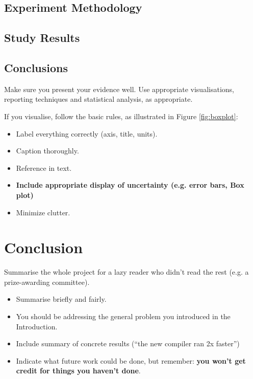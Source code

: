 \documentclass{l4proj}
\begin{document}
\section{Experiment Methodology}
\section{Study Results}

\section{Conclusions}
Make sure you present your evidence well. Use appropriate visualisations, reporting techniques and statistical analysis, as appropriate.

If you visualise, follow the basic rules, as illustrated in Figure \ref{fig:boxplot}:
\begin{itemize}
\item Label everything correctly (axis, title, units).
\item Caption thoroughly.
\item Reference in text.
\item \textbf{Include appropriate display of uncertainty (e.g. error bars, Box plot)}
\item Minimize clutter.
\end{itemize}

\chapter{Conclusion}    
Summarise the whole project for a lazy reader who didn't read the rest (e.g. a prize-awarding committee).

\begin{itemize}
    \item
        Summarise briefly and fairly.
    \item
        You should be addressing the general problem you introduced in the
        Introduction.        
    \item
        Include summary of concrete results (``the new compiler ran 2x
        faster'')
    \item
        Indicate what future work could be done, but remember: \textbf{you
        won't get credit for things you haven't done}.
\end{itemize}
\end{document}
